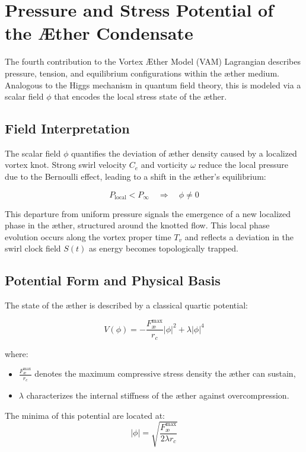 \section{Pressure and Stress Potential of the Æther Condensate}

The fourth contribution to the Vortex \AE{}ther Model (VAM) Lagrangian describes pressure, tension, and equilibrium configurations within the æther medium. Analogous to the Higgs mechanism in quantum field theory, this is modeled via a scalar field $\phi$ that encodes the local stress state of the æther.

\subsection*{Field Interpretation}

The scalar field $\phi$ quantifies the deviation of æther density caused by a localized vortex knot. Strong swirl velocity $C_e$ and vorticity $\omega$ reduce the local pressure due to the Bernoulli effect, leading to a shift in the æther's equilibrium:

\[
P_\text{local} < P_\infty \quad \Rightarrow \quad \phi \neq 0
\]

This departure from uniform pressure signals the emergence of a new localized phase in the æther, structured around the knotted flow. This local phase evolution occurs along the vortex proper time $T_v$ and reflects a deviation in the swirl clock field $S(t)$ as energy becomes topologically trapped.

\subsection*{Potential Form and Physical Basis}

The state of the æther is described by a classical quartic potential:

\[
V(\phi) = -\frac{F^{\text{max}}_{\text{\ae}}}{r_c} |\phi|^2 + \lambda |\phi|^4
\]

where:
\begin{itemize}
  \item $\frac{F^{\text{max}}_{\text{\ae}}}{r_c}$ denotes the maximum compressive stress density the æther can sustain,
  \item $\lambda$ characterizes the internal stiffness of the æther against overcompression.
\end{itemize}

The minima of this potential are located at:
\[
|\phi| = \sqrt{\frac{F^{\text{max}}_{\text{\ae}}}{2\lambda r_c}}
\]

